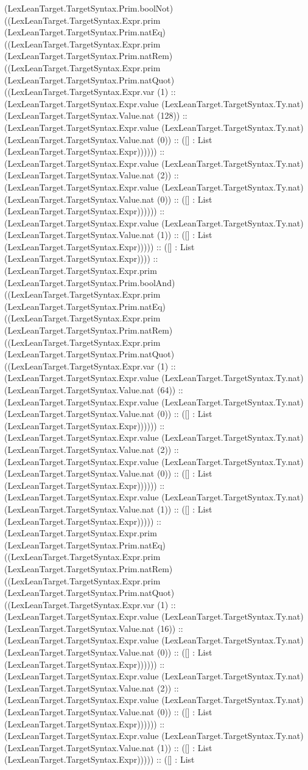 \documentclass[11pt]{article}
\begin{document}
(LexLeanTarget.TargetSyntax.Prim.boolNot) ((LexLeanTarget.TargetSyntax.Expr.prim (LexLeanTarget.TargetSyntax.Prim.natEq) ((LexLeanTarget.TargetSyntax.Expr.prim (LexLeanTarget.TargetSyntax.Prim.natRem) ((LexLeanTarget.TargetSyntax.Expr.prim (LexLeanTarget.TargetSyntax.Prim.natQuot) ((LexLeanTarget.TargetSyntax.Expr.var (1) :: (LexLeanTarget.TargetSyntax.Expr.value (LexLeanTarget.TargetSyntax.Ty.nat) (LexLeanTarget.TargetSyntax.Value.nat (128)) :: (LexLeanTarget.TargetSyntax.Expr.value (LexLeanTarget.TargetSyntax.Ty.nat) (LexLeanTarget.TargetSyntax.Value.nat (0)) :: ([] : List (LexLeanTarget.TargetSyntax.Expr)))))) :: (LexLeanTarget.TargetSyntax.Expr.value (LexLeanTarget.TargetSyntax.Ty.nat) (LexLeanTarget.TargetSyntax.Value.nat (2)) :: (LexLeanTarget.TargetSyntax.Expr.value (LexLeanTarget.TargetSyntax.Ty.nat) (LexLeanTarget.TargetSyntax.Value.nat (0)) :: ([] : List (LexLeanTarget.TargetSyntax.Expr)))))) :: (LexLeanTarget.TargetSyntax.Expr.value (LexLeanTarget.TargetSyntax.Ty.nat) (LexLeanTarget.TargetSyntax.Value.nat (1)) :: ([] : List (LexLeanTarget.TargetSyntax.Expr))))) :: ([] : List (LexLeanTarget.TargetSyntax.Expr)))) :: (LexLeanTarget.TargetSyntax.Expr.prim (LexLeanTarget.TargetSyntax.Prim.boolAnd) ((LexLeanTarget.TargetSyntax.Expr.prim (LexLeanTarget.TargetSyntax.Prim.natEq) ((LexLeanTarget.TargetSyntax.Expr.prim (LexLeanTarget.TargetSyntax.Prim.natRem) ((LexLeanTarget.TargetSyntax.Expr.prim (LexLeanTarget.TargetSyntax.Prim.natQuot) ((LexLeanTarget.TargetSyntax.Expr.var (1) :: (LexLeanTarget.TargetSyntax.Expr.value (LexLeanTarget.TargetSyntax.Ty.nat) (LexLeanTarget.TargetSyntax.Value.nat (64)) :: (LexLeanTarget.TargetSyntax.Expr.value (LexLeanTarget.TargetSyntax.Ty.nat) (LexLeanTarget.TargetSyntax.Value.nat (0)) :: ([] : List (LexLeanTarget.TargetSyntax.Expr)))))) :: (LexLeanTarget.TargetSyntax.Expr.value (LexLeanTarget.TargetSyntax.Ty.nat) (LexLeanTarget.TargetSyntax.Value.nat (2)) :: (LexLeanTarget.TargetSyntax.Expr.value (LexLeanTarget.TargetSyntax.Ty.nat) (LexLeanTarget.TargetSyntax.Value.nat (0)) :: ([] : List (LexLeanTarget.TargetSyntax.Expr)))))) :: (LexLeanTarget.TargetSyntax.Expr.value (LexLeanTarget.TargetSyntax.Ty.nat) (LexLeanTarget.TargetSyntax.Value.nat (1)) :: ([] : List (LexLeanTarget.TargetSyntax.Expr))))) :: (LexLeanTarget.TargetSyntax.Expr.prim (LexLeanTarget.TargetSyntax.Prim.natEq) ((LexLeanTarget.TargetSyntax.Expr.prim (LexLeanTarget.TargetSyntax.Prim.natRem) ((LexLeanTarget.TargetSyntax.Expr.prim (LexLeanTarget.TargetSyntax.Prim.natQuot) ((LexLeanTarget.TargetSyntax.Expr.var (1) :: (LexLeanTarget.TargetSyntax.Expr.value (LexLeanTarget.TargetSyntax.Ty.nat) (LexLeanTarget.TargetSyntax.Value.nat (16)) :: (LexLeanTarget.TargetSyntax.Expr.value (LexLeanTarget.TargetSyntax.Ty.nat) (LexLeanTarget.TargetSyntax.Value.nat (0)) :: ([] : List (LexLeanTarget.TargetSyntax.Expr)))))) :: (LexLeanTarget.TargetSyntax.Expr.value (LexLeanTarget.TargetSyntax.Ty.nat) (LexLeanTarget.TargetSyntax.Value.nat (2)) :: (LexLeanTarget.TargetSyntax.Expr.value (LexLeanTarget.TargetSyntax.Ty.nat) (LexLeanTarget.TargetSyntax.Value.nat (0)) :: ([] : List (LexLeanTarget.TargetSyntax.Expr)))))) :: (LexLeanTarget.TargetSyntax.Expr.value (LexLeanTarget.TargetSyntax.Ty.nat) (LexLeanTarget.TargetSyntax.Value.nat (1)) :: ([] : List (LexLeanTarget.TargetSyntax.Expr))))) :: ([] : List 
\end{document}
